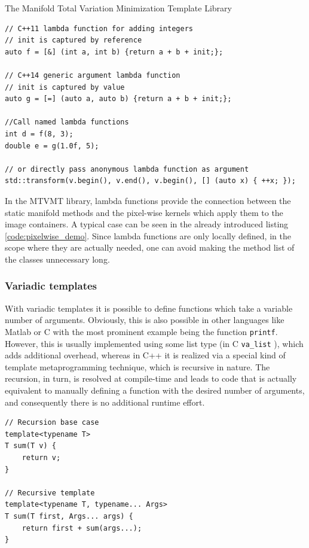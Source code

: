 \begin{chapter}{The Manifold Total Variation Minimization Template Library}
\begin{lstlisting}[label=code:lambdafun,caption={Lambda functions}]
// C++11 lambda function for adding integers
// init is captured by reference
auto f = [&] (int a, int b) {return a + b + init;};

// C++14 generic argument lambda function
// init is captured by value
auto g = [=] (auto a, auto b) {return a + b + init;};

//Call named lambda functions
int d = f(8, 3);
double e = g(1.0f, 5);

// or directly pass anonymous lambda function as argument
std::transform(v.begin(), v.end(), v.begin(), [] (auto x) { ++x; });
\end{lstlisting}

In the MTVMT library, lambda functions provide the connection between the static manifold methods and the pixel-wise kernels which apply them to the image containers.
A typical case can be seen in the already introduced listing \ref{code:pixelwise_demo}. Since lambda functions are only locally defined, in the scope where they are actually needed,
one can avoid making the method list of the classes unnecessary long.

\subsubsection{Variadic templates} %
\label{ssub:Variadic templates}
With variadic templates it is possible to define functions which take a variable number of arguments. Obviously, this is also possible in other languages like Matlab or
C with the most prominent example being the function \texttt{printf}. However, this is usually implemented using some list type (in C \texttt{va\_list} ), which adds additional 
overhead, whereas in C++ it is realized via a special kind of template metaprogramming technique, which is recursive in nature. The recursion, in turn, is resolved at compile-time
and leads to code that is actually equivalent to manually defining a function with the desired number of arguments, and consequently there is no additional runtime effort.\\

\cppinline
\begin{lstlisting}[label=code:variadic,caption={Variadic template example}]
// Recursion base case
template<typename T>
T sum(T v) {
    return v;
}

// Recursive template
template<typename T, typename... Args>
T sum(T first, Args... args) {
    return first + sum(args...);
}
\end{lstlisting}


\end{chapter}
